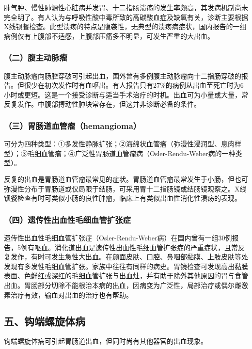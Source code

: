 肺气肿、慢性肺源性心脏病并发胃、十二指肠溃疡的发生率颇高，其发病机制尚未完全明了。有人认为与呼吸性酸中毒所致的高碳酸血症及缺氧有关，诊断主要根据X线钡餐检查。此型溃疡的特点是隐袭性，无典型的溃疡病症状，国内报告的一组病例仅有上腹部不适感，上腹部压痛多不明显，可发生严重的大出血。

\subsubsection{（二）腹主动脉瘤}

腹主动脉瘤向肠腔穿破可引起出血，国外曾有多例腹主动脉瘤向十二指肠穿破的报告。但很少在初次发作时有血呕出。有人报告只有27\%的病例从出血至死亡时为6小时或更短。这是一个接受诊断与适当手术治疗的时机。出血可为小量或大量，常反复发作。中腹部搏动性肿块常存在，但这并非诊断必备的条件。

\subsubsection{（三）胃肠道血管瘤（hemangioma）}

可分为四种类型：①多发性静脉扩张；②海绵状血管瘤（弥漫性浸润型、息肉样型）；③毛细血管瘤；④广泛性胃肠道血管瘤病（Osler-Rendu-Weber病的一种类型）。

反复的出血是胃肠道血管瘤最常见的症状。胃肠道血管瘤最常发生于小肠，但也可弥漫性分布于胃肠道或仅局限于结肠，可采用胃十二指肠镜或结肠镜观察之。X线钡餐检查有时可类似小肠的良性肿瘤，临床上有类似出血性消化性溃疡的表现。

\subsubsection{（四）遗传性出血性毛细血管扩张症}

遗传性出血性毛细血管扩张症（Osler-Rendu-Weber病）在国内曾有一组30例报告，5例有呕血。消化道出血是遗传性出血性毛细血管扩张症的严重症状，且常反复发作，有时可发生急性大出血。在颜面皮肤、口腔、鼻咽部黏膜、上肢皮肤等处发现有多发性毛细血管扩张。家族中往往有同样的病史。胃镜检查可发现高出黏膜表面、色鲜红或深红的毛细血管扩张与出血灶，并有助于除外其他原因的胃与食管出血。胃肠部分切除不能根治本病的出血，因病变为广泛性，局部治疗或偶尔雌激素治疗有效，输血对出血的治疗也有帮助。

\subsection{五、钩端螺旋体病}

钩端螺旋体病可引起胃肠道出血，但同时尚有其他器官的出血现象。

